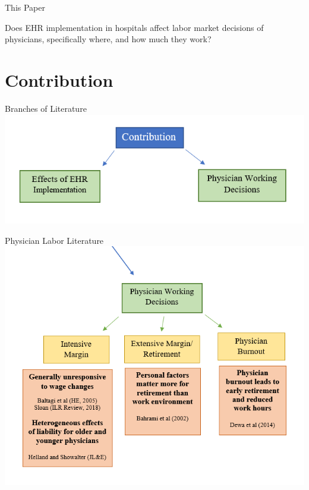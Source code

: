 \documentclass[10pt]{beamer}
\begin{document}
\begin{frame}{This Paper}

Does EHR implementation in hospitals affect labor market decisions of physicians, specifically where, and how much they work?
    
\end{frame}


\section{Contribution}

\begin{frame}{Branches of Literature}
\centering
\includegraphics[scale=.5]{graphics/Contribution_litgraphic.PNG}

\end{frame}

\begin{frame}{Physician Labor Literature}
\centering
    \includegraphics[scale=.45]{graphics/labor_litgraphic.PNG}
\end{frame}
\end{document}
